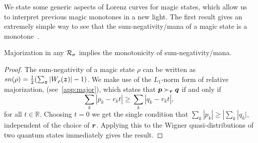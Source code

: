 \documentclass[pra,
aps,
twocolumn,
superscriptaddress,
groupedaddress,
nofootinbib,
reprint
]{revtex4-1}
\begin{document}
We state some generic aspects of Lorenz curves for magic states, which allow us to interpret previous magic monotones in a new light. The first result gives an extremely simple way to see that the sum-negativity/mana of a magic state is a monotone~\cite{cit:veitch2}.

\begin{theorem} Majorization in any ${\mathcal R}_\sigma$ implies the monotonicity of sum-negativity/mana. 
\end{theorem}
\begin{proof}
	The sum-negativity of a magic state $\rho$ can be written as $sn(\rho) =\frac{1}{2} (\sum_{\bm{z}} |W_\rho(\bm{z}) | - 1)$.
We make use of the $L_1$-norm form of relative majorization, (see~\cref{app:major}), which states that $\boldsymbol{p} \succ_{\boldsymbol{r}} \boldsymbol{q}$ if and only if
	\begin{equation}
\sum_k | p_k - r_k t | \geq \sum_k | q_k - r_k t |,
\end{equation}
for all $t\in \mathbb{R}$. Choosing $t=0$ we get the single condition that $\sum_k |p_k| \ge |\sum_k |q_k|$, independent of the choice of $\boldsymbol{r}$. Applying this to the Wigner quasi-distributions of two quantum states immediately gives the result.
\end{proof}
\end{document}

